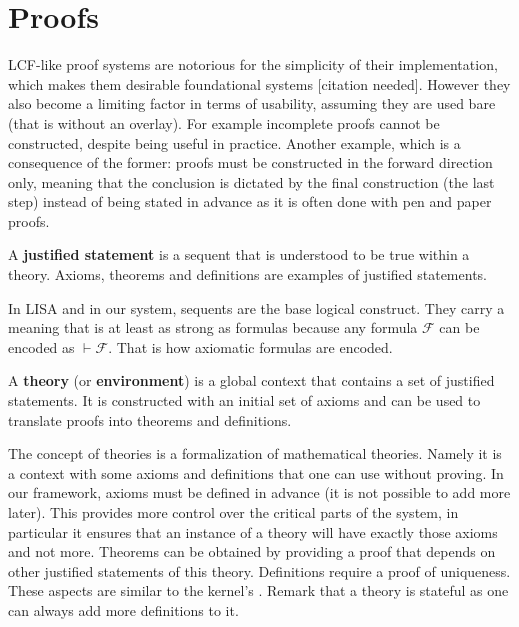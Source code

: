 \section{Proofs}
\label{sec:proofs}

LCF-like proof systems are notorious for the simplicity of their implementation, which makes them desirable foundational systems [citation needed]. However they also become a limiting factor in terms of usability, assuming they are used bare (that is without an overlay). For example incomplete proofs cannot be constructed, despite being useful in practice. Another example, which is a consequence of the former: proofs must be constructed in the forward direction only, meaning that the conclusion is dictated by the final construction (the last step) instead of being stated in advance as it is often done with pen and paper proofs.

\begin{definition}
A \textbf{justified statement} is a sequent that is understood to be true within a theory. Axioms, theorems and definitions are examples of justified statements.
\end{definition}

In LISA and in our system, sequents are the base logical construct. They carry a meaning that is at least as strong as formulas because any formula $\mathcal{F}$ can be encoded as $\vdash \mathcal{F}$. That is how axiomatic formulas are encoded.

\begin{definition}[Theory]
A \textbf{theory} (or \textbf{environment}) is a global context that contains a set of justified statements. It is constructed with an initial set of axioms and can be used to translate proofs into theorems and definitions.
\end{definition}

The concept of theories is a formalization of mathematical theories. Namely it is a context with some axioms and definitions that one can use without proving. In our framework, axioms must be defined in advance (it is not possible to add more later). This provides more control over the critical parts of the system, in particular it ensures that an instance of a theory will have exactly those axioms and not more. Theorems can be obtained by providing a proof that depends on other justified statements of this theory. Definitions require a proof of uniqueness. These aspects are similar to the kernel's . Remark that a theory is stateful as one can always add more definitions to it.

